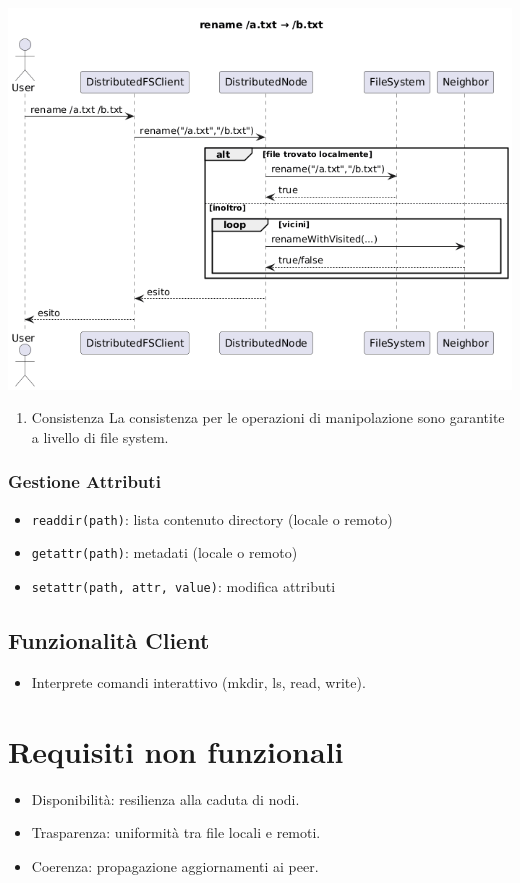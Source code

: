 \documentclass[11pt]{article}
\begin{document}
\begin{itemize}
\begin{center}
\includegraphics[width=.9\linewidth]{./img/rename.png}
\end{center}
\end{itemize}
\begin{enumerate}
\item Consistenza
\label{sec:orgd8e3334}
La consistenza per le operazioni di manipolazione sono garantite a livello di file system.
\end{enumerate}
\subsubsection{Gestione Attributi}
\label{sec:orgc3bc027}
\begin{itemize}
\item \texttt{readdir(path)}: lista contenuto directory (locale o remoto)
\item \texttt{getattr(path)}: metadati (locale o remoto)
\item \texttt{setattr(path, attr, value)}: modifica attributi
\end{itemize}
\subsection{Funzionalità Client}
\label{sec:org67c0ed6}
\begin{itemize}
\item Interprete comandi interattivo (mkdir, ls, read, write).
\end{itemize}
\section{Requisiti non funzionali}
\label{sec:org4df7e6e}
\begin{itemize}
\item Disponibilità: resilienza alla caduta di nodi.
\item Trasparenza: uniformità tra file locali e remoti.
\item Coerenza: propagazione aggiornamenti ai peer.
\end{itemize}
\end{document}
